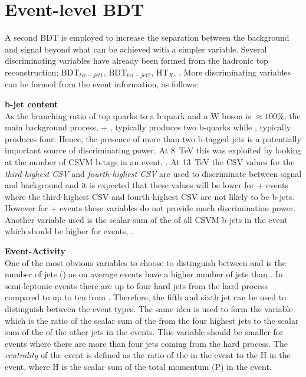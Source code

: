 \section{Event-level BDT}

A second BDT is employed to increase the separation between the \ttbar background and \tttt signal beyond what can be achieved with a simpler variable. Several discriminating variables have already been formed from the hadronic top reconstruction; BDT$_{tri-jet1}$, BDT$_{tri-jet2}$, HT$_{X}$, \sumjetmassX. More discriminating variables can be formed from the event information, as follows:

\textbf{b-jet content}\\
As the branching ratio of top quarks to a b quark and a W boson is $\approx 100\%$, the main background process, \ttbar + \llbar,  typically produces two b-quarks while \tttt, typically produces four. Hence, the presence of more than two b-tagged jets is a potentially important source of discriminating power.
At 8~TeV this was exploited by looking at the number of CSVM b-tags in an event, \nMtags. At 13~TeV the CSV values for the \emph{third-highest CSV} and \emph{fourth-highest CSV} are used to discriminate between signal and background and it is expected that these values will be lower for \ttbar + \llbar events where the third-highest CSV and fourth-highest CSV are not likely to be b-jets. However for \ttbar + \bbbar events these variables do not provide much discrimination power.
Another variable used is the scalar sum of the \HT of all CSVM b-jets in the event which should be higher for \tttt events, \htb.

\textbf{Event-Activity}\\
One of the most obvious variables to choose to distinguish between \ttbar and \tttt is the number of jets (\njets) as on average \tttt events have a higher number of jets than \ttbar. In semi-leptonic \ttbar events there are up to four hard jets from the hard process compared to up to ten from \tttt. Therefore, the fifth and sixth jet \pt can be used to distinguish between the event types. The same idea is used to form the variable \htrat which is the ratio of the scalar sum of the \HT from the four highest \pt jets to the scalar sum of the \HT of the other jets in the events. This variable should be smaller for \tttt events where there are more than four jets coming from the hard process.
The \emph{centrality} of the event is defined as the ratio of the \HT in the event to the H in the event, where H is the scalar sum of the total momentum (P) in the event.

